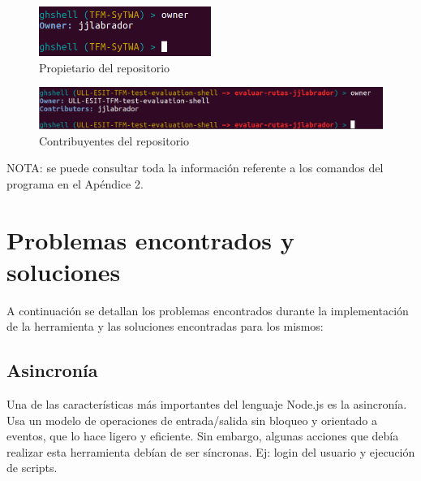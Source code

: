 		\begin{figure}[H]
		\begin{center}
		\includegraphics[width=0.5\textwidth]{images/owner1-1}
		\caption{Propietario del repositorio}
		\label{fig:owner1-1}
		\end{center}
		\end{figure}
		
		\begin{figure}[H]
		\begin{center}
		\includegraphics[width=1\textwidth]{images/owner1-2}
		\caption{Contribuyentes del repositorio}
		\label{fig:owner1-2}
		\end{center}
		\end{figure}
	
NOTA: se puede consultar toda la información referente a los comandos del programa en el Apéndice 2.

\section{Problemas encontrados y soluciones}
\label{3:sec:3}

A continuación se detallan los problemas encontrados durante la implementación de la herramienta y las soluciones encontradas para los mismos:

\subsection{Asincronía}
\label{subsec:3.3.1}

Una de las características más importantes del lenguaje Node.js es la asincronía. Usa un modelo de operaciones de entrada/salida sin bloqueo y orientado a eventos, que lo hace ligero y eficiente. Sin embargo, algunas acciones que debía realizar esta herramienta debían de ser síncronas. Ej: login del usuario y ejecución de scripts.
\bigskip

